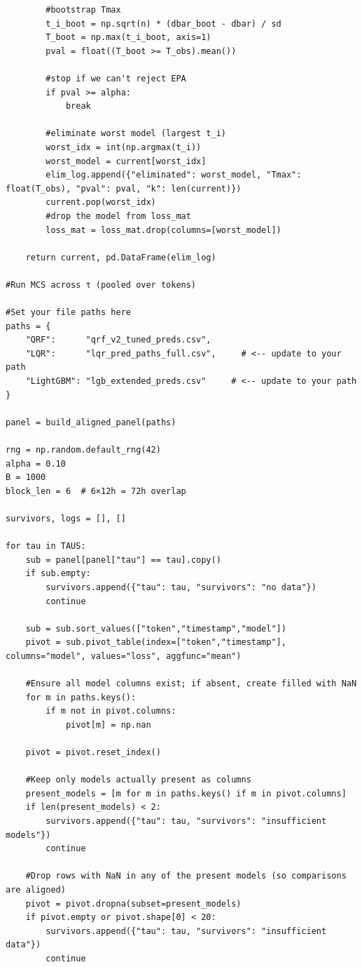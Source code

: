 \documentclass[
  a4paper,
  DIV=11,
  numbers=noendperiod]{scrreprt}
\begin{document}
\begin{verbatim}
        #bootstrap Tmax
        t_i_boot = np.sqrt(n) * (dbar_boot - dbar) / sd
        T_boot = np.max(t_i_boot, axis=1)
        pval = float((T_boot >= T_obs).mean())

        #stop if we can't reject EPA
        if pval >= alpha:
            break

        #eliminate worst model (largest t_i)
        worst_idx = int(np.argmax(t_i))
        worst_model = current[worst_idx]
        elim_log.append({"eliminated": worst_model, "Tmax": float(T_obs), "pval": pval, "k": len(current)})
        current.pop(worst_idx)
        #drop the model from loss_mat
        loss_mat = loss_mat.drop(columns=[worst_model])

    return current, pd.DataFrame(elim_log)

#Run MCS across τ (pooled over tokens)

#Set your file paths here
paths = {
    "QRF":      "qrf_v2_tuned_preds.csv",
    "LQR":      "lqr_pred_paths_full.csv",     # <-- update to your path
    "LightGBM": "lgb_extended_preds.csv"     # <-- update to your path
}

panel = build_aligned_panel(paths)

rng = np.random.default_rng(42)
alpha = 0.10
B = 1000
block_len = 6  # 6×12h = 72h overlap

survivors, logs = [], []

for tau in TAUS:
    sub = panel[panel["tau"] == tau].copy()
    if sub.empty:
        survivors.append({"tau": tau, "survivors": "no data"})
        continue

    sub = sub.sort_values(["token","timestamp","model"])
    pivot = sub.pivot_table(index=["token","timestamp"], columns="model", values="loss", aggfunc="mean")

    #Ensure all model columns exist; if absent, create filled with NaN
    for m in paths.keys():
        if m not in pivot.columns:
            pivot[m] = np.nan

    pivot = pivot.reset_index()

    #Keep only models actually present as columns
    present_models = [m for m in paths.keys() if m in pivot.columns]
    if len(present_models) < 2:
        survivors.append({"tau": tau, "survivors": "insufficient models"})
        continue

    #Drop rows with NaN in any of the present models (so comparisons are aligned)
    pivot = pivot.dropna(subset=present_models)
    if pivot.empty or pivot.shape[0] < 20:
        survivors.append({"tau": tau, "survivors": "insufficient data"})
        continue


\end{verbatim}
\end{document}
